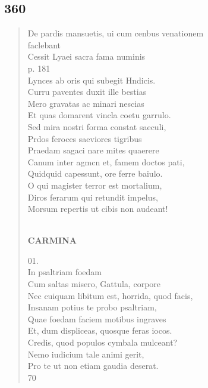 \documentclass[11pt, a4paper]{report}
\begin{document}
            \subsection*{360}
      \begin{verse}
      De pardis mansuetis, ui cum cenbus venationem \\ faclebant \\ Cessit Lyaei sacra fama numinis \\ p. 181 \\ Lynces ab oris qui subegit Hndicis. \\ Curru paventes duxit ille bestias \\ Mero gravatas ac minari nescias \\ Et quas domarent vincla coetu garrulo. \\ Sed mira nostri forma constat saeculi, \\ Prdos feroces saeviores tigribus \\ Praedam sagaci nare mites quaerere \\ Canum inter agmcn et, famem doctos pati, \\ Quidquid capessunt, ore ferre baiulo. \\ O qui magister terror est mortalium, \\ Diros ferarum qui retundit impelus, \\ Morsum repertis ut cibis non audeant! \\ 
        ﻿\pagebreak 
     \marginpar{[020]} \begin{center} \textbf{CARMINA} \end{center}01. \\ In psaltriam foedam \\ Cum saltas misero, Gattula, corpore \\ Nec cuiquam libitum est, horrida, quod facis, \\ Insanam potius te probo psaltriam, \\ Quae foedam faciem motibus ingraves \\ Et, dum displiceas, quosque feras iocos. \\ Credis, quod populos cymbala mulceant? \\ Nemo iudicium tale animi gerit, \\ Pro te ut non etiam gaudia deserat. \\ 70 \\ 
      \end{verse}
  
\end{document}

